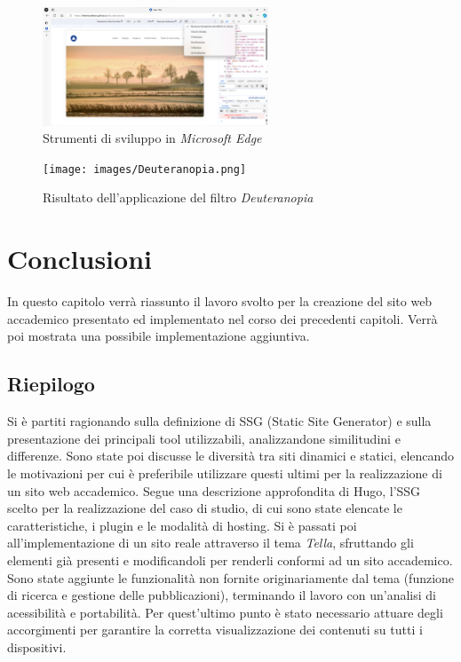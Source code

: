 \documentclass[target=bach,aauheader=]{thud}
\begin{document}
\begin{figure}
    \centering
    \includegraphics[width = 0.6\textwidth]{images/dev-tools.png}
    \caption{Strumenti di sviluppo in \textit{Microsoft Edge}}
\end{figure}

\begin{figure}
    \centering
    \texttt{[image: images/Deuteranopia.png]}
    \caption{Risultato dell'applicazione del filtro \textit{Deuteranopia}}
    \label{img:deuteranopia}
\end{figure}
 

\chapter{Conclusioni}
In questo capitolo verrà riassunto il lavoro svolto per la creazione del sito web accademico presentato ed implementato nel corso dei precedenti capitoli. 
Verrà poi mostrata una possibile implementazione aggiuntiva.

\section{Riepilogo}
Si è partiti ragionando sulla definizione di SSG (Static Site Generator) e sulla presentazione dei principali tool utilizzabili, analizzandone similitudini e differenze.
Sono state poi discusse le diversità tra siti dinamici e statici, elencando le motivazioni per cui è preferibile utilizzare questi ultimi per la realizzazione di un sito web accademico.   
\newline
Segue una descrizione approfondita di Hugo, l'SSG scelto per la realizzazione del caso di studio, di cui sono state elencate le caratteristiche, i plugin e le modalità di hosting.
Si è passati poi all'implementazione di un sito reale attraverso il tema \textit{Tella}, sfruttando gli elementi già presenti e modificandoli per renderli conformi ad un sito accademico. 
Sono state aggiunte le funzionalità non fornite originariamente dal tema (funzione di ricerca e gestione delle pubblicazioni), terminando il lavoro con un'analisi di acessibilità e portabilità. 
Per quest'ultimo punto è stato necessario attuare degli accorgimenti per garantire la corretta visualizzazione dei contenuti su tutti i dispositivi.  
\end{document}
